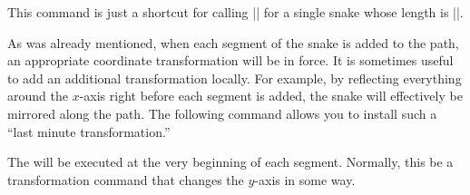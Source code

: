 \begin{command}{\pgfpathsnaketo{}}
  This command is just a shortcut for calling |\pgfpathsnakesto| for a
  single snake whose length is |\pgfsnakeremainingdistance|.
\begin{codeexample}[]
\end{codeexample}
\end{command}

As was already mentioned, when each segment of the snake is added to
the path, an appropriate coordinate transformation will be in
force. It is sometimes useful to add an additional transformation
locally. For example, by reflecting everything around the $x$-axis
right before each segment is added, the snake will effectively be
mirrored along the path. The following command allows you to install
such a ``last minute transformation.''

\begin{command}{\pgfsetsnakesegmenttransformation{}}
  The  will be executed at the very beginning of each
  segment. Normally, this be a transformation command that changes the
  $y$-axis in some way.
\end{command}




